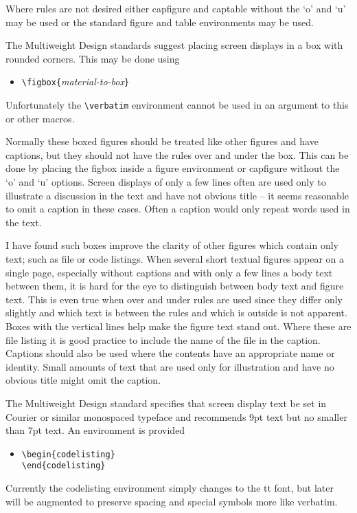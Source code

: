 Where rules are not desired either capfigure and captable without the
`o' and `u' may be used or the standard figure and table environments
may be used. 

The Multiweight Design standards suggest placing screen displays in a
box with rounded corners.  This may be done using
  \begin{itemize}
    \item[]\verb|\figbox{|{\it material-to-box}\verb|}|
  \end{itemize}
  \begin{note}
    Unfortunately the \verb|\verbatim| environment cannot be used in an
    argument to this or other macros.
  \end{note}

Normally these boxed figures should be treated like other figures and
have captions, but they should not have the rules over and under the
box.  This can be done by placing the figbox inside a figure
environment or capfigure without the `o' and `u' options.  Screen
displays of only a few lines often are used only to illustrate a
discussion in the text and have not obvious title -- it seems
reasonable to omit a caption in these cases.  Often a caption would
only repeat words used in the text.

I have found such boxes improve the clarity
of other figures which contain only text; such as file or code
listings.  When several short textual figures appear on a single page,
especially without captions and with only a few lines a body text
between them, it is hard for the eye to distinguish between body text
and figure text.  This is even true when over and under rules are used
since they differ only slightly and which text is between the rules
and which is outside is not apparent.  Boxes with the vertical lines
help make the figure text stand out.  Where these are file listing it
is good practice to include the name of the file in the caption.
Captions should also be used where the contents have an appropriate
name or identity.  Small amounts of text that are used only for
illustration and have no obvious title might omit the caption.

The Multiweight Design standard specifies that screen display text be
set in Courier or similar monospaced typeface and recommends 9pt text
but no smaller than 7pt text.  An environment is provided 
  \begin{itemize}
    \item[]
          \verb|\begin{codelisting}|\\
          \verb|\end{codelisting}|
  \end{itemize}
Currently the codelisting environment simply changes to the tt font,
but later will be augmented to preserve spacing and special symbols
more like verbatim.
